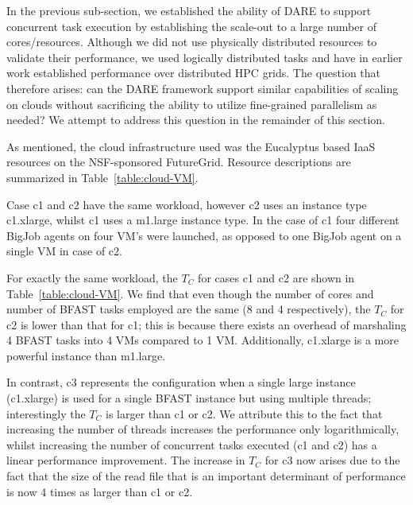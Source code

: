 \documentclass{sig-alternate}
\begin{document}
In the previous sub-section, we established the ability of DARE to
support concurrent task execution by establishing the scale-out to a
large number of cores/resources. Although we did not use physically
distributed resources to validate their performance, we used logically
distributed tasks and have in earlier work established performance
over distributed HPC grids\cite{saga-ccgrid10}.  The question that
therefore arises: can the DARE framework support similar capabilities
of scaling on clouds without sacrificing the ability to utilize
fine-grained parallelism as needed? We attempt to address this
question in the remainder of this section.

As mentioned, the cloud infrastructure used was the Eucalyptus based
IaaS resources on the NSF-sponsored FutureGrid\cite{futuregrid}.
Resource descriptions are summarized in Table~\ref{table:cloud-VM}.

Case c1 and c2 have the same workload, however c2 uses an instance
type c1.xlarge, whilst c1 uses a m1.large instance type.  In the case
of c1 four different BigJob agents on four VM's were launched, as
opposed to one BigJob agent on a single VM in case of c2.

For exactly the same workload, the $T_C$ for cases c1 and c2 are shown
in Table~\ref{table:cloud-VM}. We find that even though the number of
cores and number of BFAST tasks employed are the same (8 and 4
respectively), the $T_C$ for c2 is lower than that for c1; this is
because there exists an overhead of marshaling 4 BFAST tasks into 4
VMs compared to 1 VM.  Additionally, c1.xlarge is a more powerful
instance than m1.large. 

In contrast, c3 represents the configuration when a single large
instance (c1.xlarge) is used for a single BFAST instance but using
multiple threads; interestingly the $T_C$ is larger than c1 or c2.  We
attribute this to the fact that increasing the number of threads
increases the performance only logarithmically, whilst increasing the
number of concurrent tasks executed (c1 and c2) has a linear
performance improvement. The increase in $T_C$ for c3 now arises
due to the fact that the size of the read file that is
an important determinant of performance is now 4 times as larger
than c1 or c2.


\end{document}
